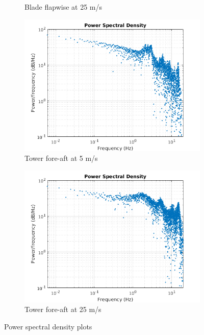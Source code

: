 \documentclass[10pt]{article}
\begin{document}
\begin{figure}[H]
\begin{subfigure}{0.40\textwidth}
      \caption{Blade flapwise at 25 m/s}
\end{subfigure}
\begin{subfigure}{0.40\textwidth}
  \includegraphics[width=1\linewidth]{../CIP_6/FAST/PSD_plots/PSD_ws5_wake8_TowerFore.png}
      \caption{Tower fore-aft at 5 m/s}
\end{subfigure}
\begin{subfigure}{0.40\textwidth}
  \includegraphics[width=1\linewidth]{../CIP_6/FAST/PSD_plots/PSD_ws25_wake8_TowerFore.png}
        \caption{Tower fore-aft at 25 m/s}
\end{subfigure}
\caption{Power spectral density plots}
\label{fig:psdplots}
\end{figure}
\end{document}
